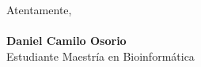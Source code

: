 \documentclass[12pt,a4paper]{article}
\begin{document}
Atentamente,\\
\\
\textbf{Daniel Camilo Osorio}\\
Estudiante Maestría en Bioinformática
\end{document}
